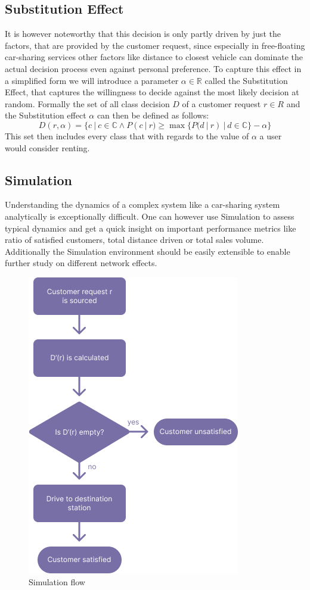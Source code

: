 \subsection{Substitution Effect}
\label{sub_sec:Method/Substitution}

It is however noteworthy that this decision is only
partly driven by just the factors, that are provided by the customer request, since especially in free-floating car-sharing services
other factors like distance to closest vehicle can dominate the actual decision process even against personal
preference. To capture this effect in a simplified form we will introduce a parameter $\alpha \in \mathbb{R}$
called the Substitution Effect, that captures the willingness to decide against the most likely
decision at random. Formally the set of all class decision $D$ of a customer request $r \in R$ and the 
Substitution effect $\alpha$ can then be defined as follows:
$$
  D(r, \alpha) = \{ c \ | \ c \in \mathbb{C} \land P(c \ | \ r) \ge \max\{ P(d \ | \ r) \ | \ d \in \mathbb{C} \} - \alpha \}
$$
This set then includes every class that with regards to the value of $\alpha$ a user would consider renting.

\subsection{Simulation}
\label{sub_sec:Method/Simulation}

Understanding the dynamics of a complex system like a car-sharing system analytically is exceptionally difficult.
One can however use Simulation to assess typical dynamics and get a quick insight on important performance metrics
like ratio of satisfied customers, total distance driven or total sales volume. Additionally the Simulation
environment should be easily extensible to enable further study on different network effects. 

\begin{figure}[htbp]
  \centering
  \includegraphics[width=.5\linewidth]{./Figures/event-flow.png}
  \caption{Simulation flow}
  \label{fig:Flow}
\end{figure}

